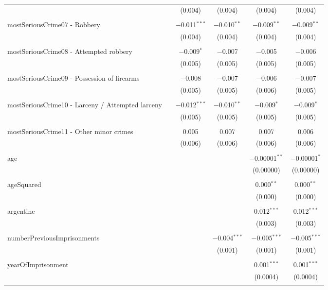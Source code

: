 \documentclass{article}
\begin{document}
\begin{table}[!htbp]
{\begin{tabular}{@{\extracolsep{5pt}}lccccc}
  &  & (0.004) & (0.004) & (0.004) & (0.004) \\ 
  & & & & & \\ 
 mostSeriousCrime07 - Robbery &  & $-$0.011$^{***}$ & $-$0.010$^{**}$ & $-$0.009$^{**}$ & $-$0.009$^{**}$ \\ 
  &  & (0.004) & (0.004) & (0.004) & (0.004) \\ 
  & & & & & \\ 
 mostSeriousCrime08 - Attempted robbery &  & $-$0.009$^{*}$ & $-$0.007 & $-$0.005 & $-$0.006 \\ 
  &  & (0.005) & (0.005) & (0.005) & (0.005) \\ 
  & & & & & \\ 
 mostSeriousCrime09 - Possession of firearms &  & $-$0.008 & $-$0.007 & $-$0.006 & $-$0.007 \\ 
  &  & (0.005) & (0.005) & (0.006) & (0.005) \\ 
  & & & & & \\ 
 mostSeriousCrime10 - Larceny / Attempted larceny &  & $-$0.012$^{***}$ & $-$0.010$^{**}$ & $-$0.009$^{*}$ & $-$0.009$^{*}$ \\ 
  &  & (0.005) & (0.005) & (0.005) & (0.005) \\ 
  & & & & & \\ 
 mostSeriousCrime11 - Other minor crimes &  & 0.005 & 0.007 & 0.007 & 0.006 \\ 
  &  & (0.006) & (0.006) & (0.006) & (0.006) \\ 
  & & & & & \\ 
 age &  &  &  & $-$0.00001$^{**}$ & $-$0.00001$^{*}$ \\ 
  &  &  &  & (0.00000) & (0.00000) \\ 
  & & & & & \\ 
 ageSquared &  &  &  & 0.000$^{**}$ & 0.000$^{**}$ \\ 
  &  &  &  & (0.000) & (0.000) \\ 
  & & & & & \\ 
 argentine &  &  &  & 0.012$^{***}$ & 0.012$^{***}$ \\ 
  &  &  &  & (0.003) & (0.003) \\ 
  & & & & & \\ 
 numberPreviousImprisonments &  &  & $-$0.004$^{***}$ & $-$0.005$^{***}$ & $-$0.005$^{***}$ \\ 
  &  &  & (0.001) & (0.001) & (0.001) \\ 
  & & & & & \\ 
 yearOfImprisonment &  &  &  & 0.001$^{***}$ & 0.001$^{***}$ \\ 
  &  &  &  & (0.0004) & (0.0004) \\ 
  & & & & & \\ 
  

\end{tabular}}
\end{table}
\end{document}
